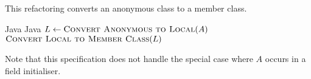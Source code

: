 \subsection{}
This refactoring converts an anonymous class to a member class.

\begin{algorithm}
\caption{$\refactoring{Convert Anonymous to Nested}(A : \type{AnonymousClass}) : \type{MemberType}$}
\begin{algorithmic}[1]
\REQUIRE Java
\ENSURE Java
\medskip
\STATE $L \leftarrow \textsc{Convert Anonymous to Local}(A)$
\RETURN $\textsc{Convert Local to Member Class}(L)$
\end{algorithmic}
\end{algorithm}

Note that this specification does not handle the special case where $A$ occurs in a field initialiser.
